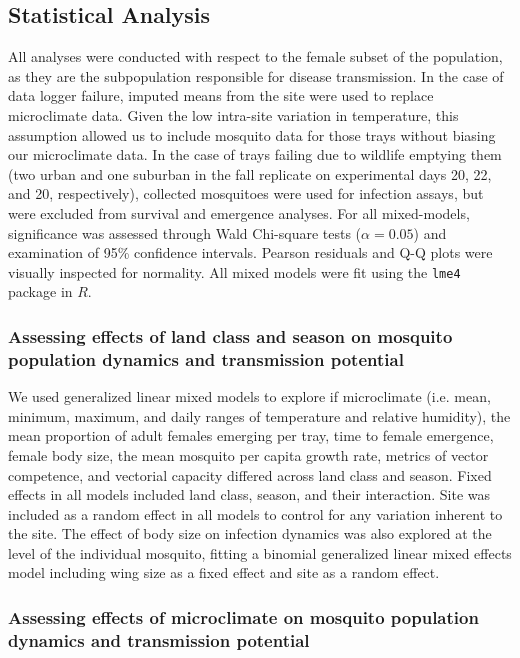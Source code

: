 \documentclass[12pt]{article}
\begin{document}
\subsection{Statistical Analysis}

All analyses were conducted with respect to the female subset of the population, as they are the subpopulation responsible for disease transmission. In the case of data logger failure, imputed means from the site were used to replace microclimate data. Given the low intra-site variation in temperature, this assumption allowed us to include mosquito data for those trays without biasing our microclimate data. In the case of trays failing due to wildlife emptying them (two urban and one suburban in the fall replicate on experimental days 20, 22, and 20, respectively), collected mosquitoes were used for infection assays, but were excluded from survival and emergence analyses. For all mixed-models, significance was assessed through Wald Chi-square tests ($\alpha=0.05$) and examination of 95\% confidence intervals. Pearson residuals and Q-Q plots were visually inspected for normality. All mixed models were fit using the \texttt{lme4} package in $R$.

\subsubsection{Assessing effects of land class and season on mosquito population dynamics and transmission potential}

We used generalized linear mixed models to explore if microclimate (i.e. mean, minimum, maximum, and daily ranges of temperature and relative humidity), the mean proportion of adult females emerging per tray, time to female emergence, female body size, the mean mosquito per capita growth rate, metrics of vector competence, and vectorial capacity differed across land class and season. Fixed effects in all models included land class, season, and their interaction. Site was included as a random effect in all models to control for any variation inherent to the site. The effect of body size on infection dynamics was also explored at the level of the individual mosquito, fitting a binomial generalized linear mixed effects model including wing size as a fixed effect and site as a random effect.

\subsubsection{Assessing effects of microclimate on mosquito population dynamics and transmission potential}
\end{document}
